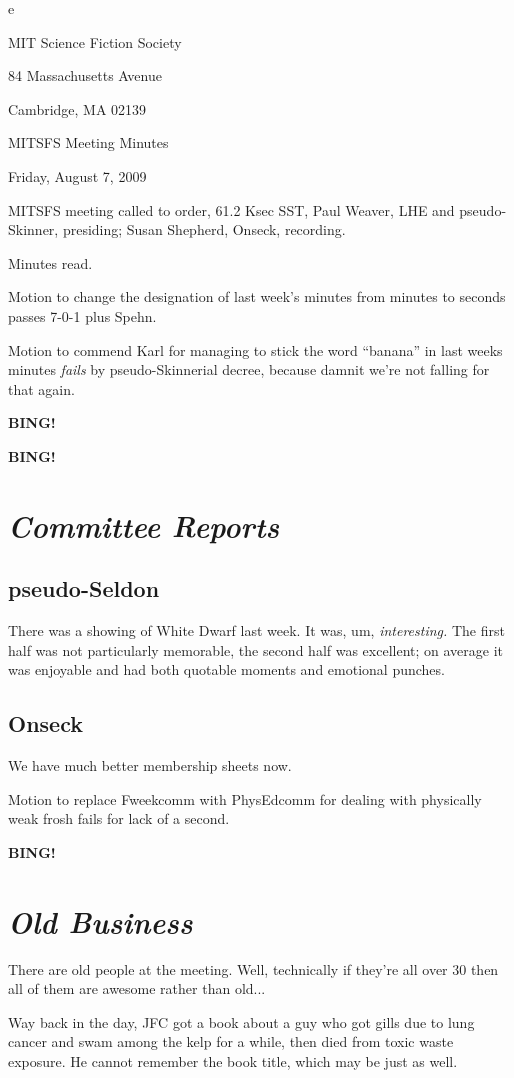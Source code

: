 e\documentclass[10pt]{article}
\newcommand{\bing}{{\bf BING!} }
\newcommand{\goto}[1]{\bing \vskip 12pt \section*{{\em{#1}}}}
\newcommand{\ps}{ plus Spehn\xspace}
\begin{document}
\begin{center}

MIT Science Fiction Society

84 Massachusetts Avenue

Cambridge, MA 02139

\vspace{12pt}

MITSFS Meeting Minutes

Friday, August 7, 2009

\end{center}

\vspace{18pt}

\setlength{\parskip}{6pt}

\noindent
MITSFS meeting called to order, 61.2 Ksec SST,
Paul Weaver, LHE and pseudo-Skinner, presiding; Susan Shepherd, Onseck, recording.

Minutes read.

Motion to change the designation of last week's minutes from minutes to seconds passes 7-0-1\ps.

Motion to commend Karl for managing to stick the word ``banana'' in last weeks minutes \emph{fails} by pseudo-Skinnerial decree, because damnit we're not falling for that again.

\bing

\goto{Committee Reports}

\subsection*{pseudo-Seldon}
There was a showing of White Dwarf last week. It was, um, \emph{interesting.} The first half was not particularly memorable, the second half was excellent; on average it was enjoyable and had both quotable moments and emotional punches.

\subsection*{Onseck}
We have much better membership sheets now.

Motion to replace Fweekcomm with PhysEdcomm for dealing with physically weak frosh fails for lack of a second.

\goto{Old Business}

There are old people at the meeting. Well, technically if they're all over 30 then all of them are awesome rather than old...

Way back in the day, JFC got a book about a guy who got gills due to lung cancer and swam among the kelp for a while, then died from toxic waste exposure. He cannot remember the book title, which may be just as well.
\end{document}
